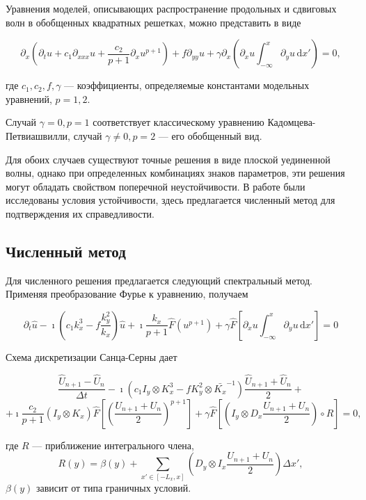 \begin{frame}
Уравнения моделей, описывающих распространение продольных и сдвиговых волн в обобщенных квадратных решетках\footnotemark, можно представить в виде
\begin{small}
$$
	\label{kp3gen}
	\partial_x\left(\partial_t u+c_1 \partial_{xxx} u+\frac{c_2 }{p+1}\partial_x u^{p+1}\right)+f \partial_{yy} u+\gamma \partial_x\left(\partial_x u \int_{-\infty}^x \partial_y u \, \mathrm{d} x'\right)=0,
$$
\end{small}
где $ c_1, c_2, f, \gamma $ --- коэффициенты, определяемые константами модельных уравнений, $p = 1,2$.

Случай $\gamma = 0, p = 1$ соответствует классическому уравнению Кадомцева-Петвиашвилли, случай $\gamma \ne 0, p = 2$ --- его обобщенный вид. 

Для обоих случаев существуют точные решения в виде плоской уединенной волны, однако при определенных комбинациях знаков параметров, эти решения могут обладать свойством поперечной неустойчивости. В работе были исследованы условия устойчивости, здесь предлагается численный метод для подтверждения их справедливости.

\end{frame}

\subsection{Численный метод}
\begin{frame}
	Для численного решения предлагается следующий спектральный метод. Применяя преобразование Фурье к уравнению, получаем
	\begin{small}
$$	
	\partial_t \hat{u} - \imath\left( c_1 k_x^3 - f \frac{k_y^2}{k_x} \right) \hat{u} + \imath \frac{k_x}{p+1} \hat{F} \left(u^{p+1}\right)+\gamma \hat{F} \left[\partial_x u \int_{-\infty}^x \partial_y u \, \mathrm{d}x'\right]=0
$$
	\end{small}

	Схема дискретизации Санца-Серны дает
	\begin{small}	
$$
	\frac{\hat{U}_{n+1} - \hat{U}_{n}}{\Delta t} - \imath \left(c_1 I_y \otimes K_x^3 - f K_y^2 \otimes \bar{K_x}^{-1} \right) \frac{\hat{U}_{n+1} + \hat{U}_{n}}{2} +
$$
$$
	+\imath \frac{c_2}{p+1}\left( I_y \otimes K_x \right) \hat{F} \left[ \left( \frac{U_{n+1} + U_{n}}{2}  \right)^{p+1}\right] + \gamma \hat{F} \left[ \left(I_y \otimes D_x \frac{U_{n+1} + U_{n}}{2} \right) \circ R \right] = 0,
$$
	\end{small}
где $R$ --- приближение интегрального члена,
$$
	R(y) = \beta(y) + \sum_{x' \in \left[ -L_x, x\right]} \left(D_y \otimes I_x \frac{U_{n+1} + U_{n}}{2}\right) \Delta x',
$$
$\beta(y)$ зависит от типа граничных условий.
\end{frame}

